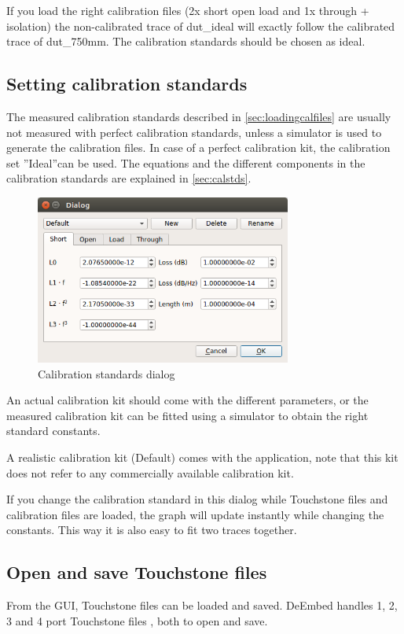If you load the right calibration files (2x short open load and 1x through + isolation) the non-calibrated trace of dut\_ideal will exactly follow the calibrated trace of dut\_750mm. The calibration standards should be chosen as ideal.
\newpage
\subsection{Setting calibration standards}
\label{sec:settingcalstds}

The measured calibration standards described in \ref{sec:loadingcalfiles} are usually not measured with perfect calibration standards, unless a simulator is used to generate the calibration files. In case of a perfect calibration kit, the calibration set ''Ideal''can be used. The equations and the different components in the calibration standards are explained in \ref{sec:calstds}.

\begin{figure}[H]
	\centering
	\includegraphics[width=0.75\textwidth]{figures/screenshot4.png}
	\caption{Calibration standards dialog}
	\label{fig:calstddialog}
\end{figure}

An actual calibration kit should come with the different parameters, or the measured calibration kit can be fitted using a simulator to obtain the right standard constants.

A realistic calibration kit (Default) comes with the application, note that this kit does not refer to any commercially available calibration kit.

If you change the calibration standard in this dialog while Touchstone files and calibration files are loaded, the graph will update instantly while changing the constants. This way it is also easy to fit two traces together.
\subsection{Open and save Touchstone files}
From the GUI, Touchstone files can be loaded and saved. DeEmbed handles 1, 2, 3 and 4 port Touchstone files \cite{touchstoneformat}, both to open and save.
